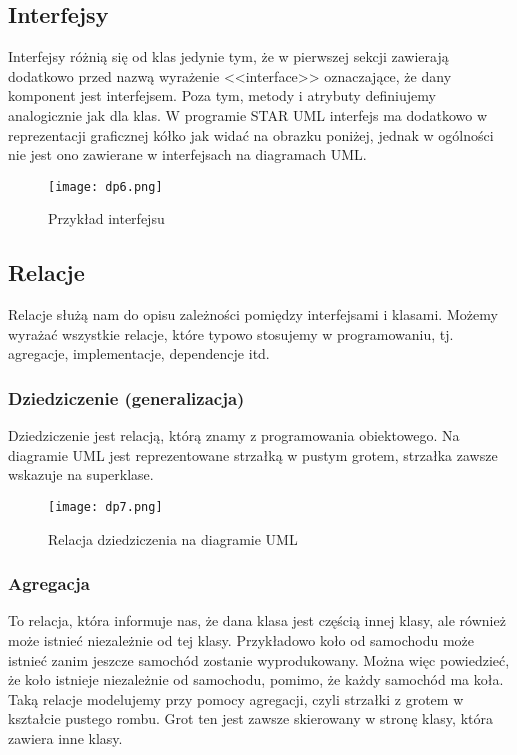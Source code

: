 \documentclass[a4paper,15pt]{article}
\begin{document}
\subsection{Interfejsy}

Interfejsy różnią się od klas jedynie tym, że w pierwszej sekcji zawierają dodatkowo przed nazwą wyrażenie <<interface>> oznaczające, że dany komponent jest interfejsem. Poza tym, metody i atrybuty definiujemy analogicznie jak dla klas. W programie STAR UML interfejs ma dodatkowo w reprezentacji graficznej kółko jak widać na obrazku poniżej, jednak w ogólności nie jest ono zawierane w interfejsach na diagramach UML.

\begin{figure}[H]
\centering
  \texttt{[image: dp6.png]}
  \caption{Przykład interfejsu}
\end{figure}


\subsection{Relacje}
Relacje służą nam do opisu zależności pomiędzy interfejsami i klasami. Możemy wyrażać wszystkie relacje, które typowo stosujemy w programowaniu, tj. agregacje, implementacje, dependencje itd. 

\subsubsection{Dziedziczenie (generalizacja)}
Dziedziczenie jest relacją, którą znamy z programowania obiektowego. Na diagramie UML jest reprezentowane strzałką w pustym grotem, strzałka zawsze wskazuje na superklase. 
\begin{figure}[H]
\centering
  \texttt{[image: dp7.png]}
  \caption{Relacja dziedziczenia na diagramie UML}
\end{figure}


\subsubsection{Agregacja}
To relacja, która informuje nas, że dana klasa jest częścią innej klasy, ale również może istnieć niezależnie od tej klasy. Przykładowo koło od samochodu może istnieć zanim jeszcze samochód zostanie wyprodukowany. Można więc powiedzieć, że koło istnieje niezależnie od samochodu, pomimo, że każdy samochód ma koła. Taką relacje modelujemy przy pomocy agregacji, czyli strzałki z grotem w kształcie pustego rombu. Grot ten jest zawsze skierowany w stronę klasy, która zawiera inne klasy. 
\end{document}
